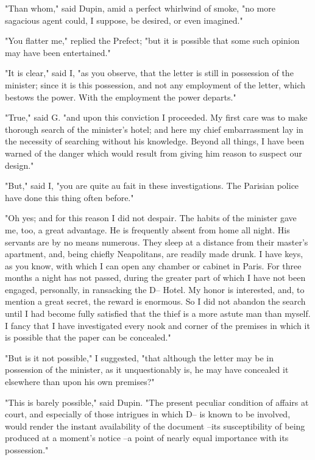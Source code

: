 \documentclass{article}
\begin{document}
"Than whom," said Dupin, amid a perfect whirlwind of smoke, "no more sagacious agent could, I suppose, be desired, or even imagined."

"You flatter me," replied the Prefect; "but it is possible that some such opinion may have been entertained."

"It is clear," said I, "as you observe, that the letter is still in possession of the minister; since it is this possession, and not any employment of the letter, which bestows the power. With the employment the power departs."

"True," said G. "and upon this conviction I proceeded. My first care was to make thorough search of the minister's hotel; and here my chief embarrassment lay in the necessity of searching without his knowledge. Beyond all things, I have been warned of the danger which would result from giving him reason to suspect our design."

"But," said I, "you are quite au fait in these investigations. The Parisian police have done this thing often before."

"Oh yes; and for this reason I did not despair. The habits of the minister gave me, too, a great advantage. He is frequently absent from home all night. His servants are by no means numerous. They sleep at a distance from their master's apartment, and, being chiefly Neapolitans, are readily made drunk. I have keys, as you know, with which I can open any chamber or cabinet in Paris. For three months a night has not passed, during the greater part of which I have not been engaged, personally, in ransacking the D-- Hotel. My honor is interested, and, to mention a great secret, the reward is enormous. So I did not abandon the search until I had become fully satisfied that the thief is a more astute man than myself. I fancy that I have investigated every nook and corner of the premises in which it is possible that the paper can be concealed."

"But is it not possible," I suggested, "that although the letter may be in possession of the minister, as it unquestionably is, he may have concealed it elsewhere than upon his own premises?"

"This is barely possible," said Dupin. "The present peculiar condition of affairs at court, and especially of those intrigues in which D-- is known to be involved, would render the instant availability of the document --its susceptibility of being produced at a moment's notice --a point of nearly equal importance with its possession."
\end{document}
